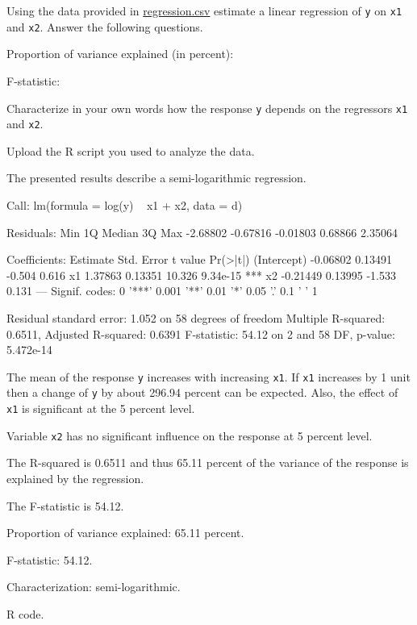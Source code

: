 
\begin{question}
Using the data provided in \url{regression.csv} estimate a linear regression of
\texttt{y} on \texttt{x1} and \texttt{x2}. Answer the following questions.

\begin{answerlist}
  \item Proportion of variance explained (in percent):
  \item F-statistic:
  \item Characterize in your own words how the response \texttt{y} depends on the regressors \texttt{x1} and \texttt{x2}.
  \item Upload the R script you used to analyze the data.
\end{answerlist}
\end{question}

\begin{solution}
The presented results describe a semi-logarithmic regression.

\begin{Schunk}
\begin{Soutput}
Call:
lm(formula = log(y) ~ x1 + x2, data = d)

Residuals:
     Min       1Q   Median       3Q      Max 
-2.68802 -0.67816 -0.01803  0.68866  2.35064 

Coefficients:
            Estimate Std. Error t value Pr(>|t|)    
(Intercept) -0.06802    0.13491  -0.504    0.616    
x1           1.37863    0.13351  10.326 9.34e-15 ***
x2          -0.21449    0.13995  -1.533    0.131    
---
Signif. codes:  0 '***' 0.001 '**' 0.01 '*' 0.05 '.' 0.1 ' ' 1

Residual standard error: 1.052 on 58 degrees of freedom
Multiple R-squared:  0.6511,	Adjusted R-squared:  0.6391 
F-statistic: 54.12 on 2 and 58 DF,  p-value: 5.472e-14
\end{Soutput}
\end{Schunk}

The mean of the response \texttt{y} increases with increasing \texttt{x1}.
If \texttt{x1} increases by 1 unit then a change of \texttt{y} by about 296.94 percent can be expected.
Also, the effect of \texttt{x1} is  significant at the 5 percent level.

Variable \texttt{x2} has no significant influence on the response at 5 percent level.

The R-squared is 0.6511 and thus 65.11 percent of the
variance of the response is explained by the regression.

The F-statistic is 54.12.

\begin{answerlist}
  \item Proportion of variance explained: 65.11 percent.
  \item F-statistic: 54.12.
  \item Characterization: semi-logarithmic.
  \item R code.
\end{answerlist}
\end{solution}

